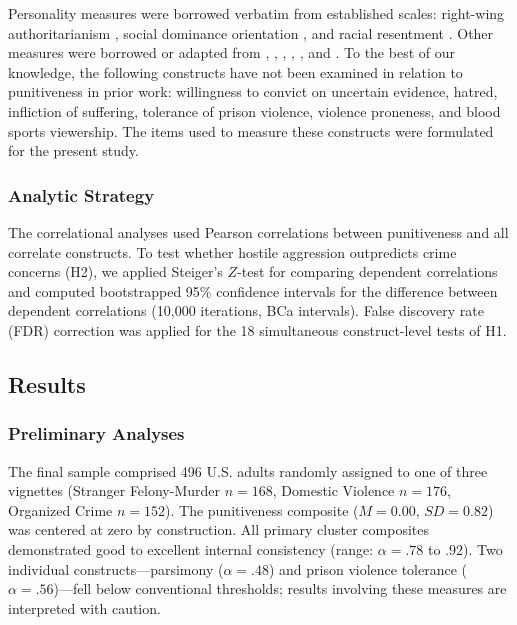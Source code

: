 Personality measures were borrowed verbatim from established scales: right-wing authoritarianism \citep{BizumicDuckitt2018}, social dominance orientation \citep{HoEtAl2015}, and racial resentment \citep{KinderSanders1996}. Other measures were borrowed or adapted from \citet{Cullen1985}, \citet{ChiricosWelchGertz2004}, \citet{LecciMyers2008}, \citet{KingMaruna2009}, \citet{TylerBoeckmann1997}, and \citet{Wozniak2016}. To the best of our knowledge, the following constructs have not been examined in relation to punitiveness in prior work: willingness to convict on uncertain evidence, hatred, infliction of suffering, tolerance of prison violence, violence proneness, and blood sports viewership. The items used to measure these constructs were formulated for the present study.

\subsubsection{Analytic Strategy}

The correlational analyses used Pearson correlations between punitiveness and all correlate constructs. To test whether hostile aggression outpredicts crime concerns (H2), we applied Steiger's $Z$-test for comparing dependent correlations \citep{steiger1980tests} and computed bootstrapped 95\% confidence intervals for the difference between dependent correlations (10{,}000 iterations, BCa intervals). False discovery rate (FDR) correction was applied for the 18 simultaneous construct-level tests of H1.

\subsection{Results}

\subsubsection{Preliminary Analyses}

The final sample comprised 496 U.S. adults randomly assigned to one of three vignettes (Stranger Felony-Murder $n = 168$, Domestic Violence $n = 176$, Organized Crime $n = 152$). The punitiveness composite ($M = 0.00$, $SD = 0.82$) was centered at zero by construction. All primary cluster composites demonstrated good to excellent internal consistency (range: $\alpha = .78$ to $.92$). Two individual constructs---parsimony ($\alpha = .48$) and prison violence tolerance ($\alpha = .56$)---fell below conventional thresholds; results involving these measures are interpreted with caution.


